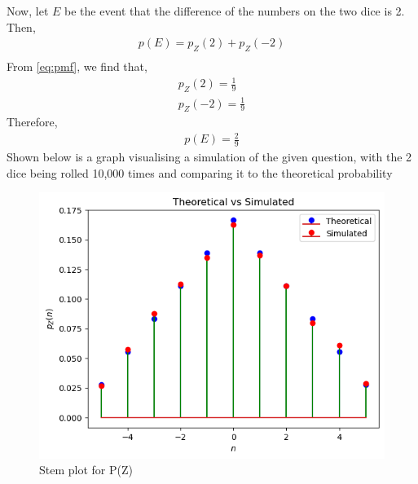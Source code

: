 \documentclass[]{article}
\begin{document}
Now, let $E$ be the event that the difference of the numbers on the two dice is 2. Then,
\begin{align}
  p(E) = p_Z(2) +p_Z(-2)\\
\end{align}
From \eqref{eq:pmf}, we find that,
\begin{align}
  p_Z(2) = \frac{1}{9} \\
  p_Z(-2) = \frac{1}{9}
\end{align}
Therefore,
\begin{align}
  p(E)=\frac{2}{9}
\end{align}
Shown below is a graph visualising a simulation of the given question, with the 2 dice being rolled 10,000 times and comparing it to the theoretical probability
\begin{figure}[h]
  \includegraphics[width=\columnwidth]{exemplar/10/13/3/26/figs/Z.png}
  \caption{Stem plot for P(Z)}
  \label{fig:exemplar/10/13/3/1/Z/}
\end{figure}
\end{document}
